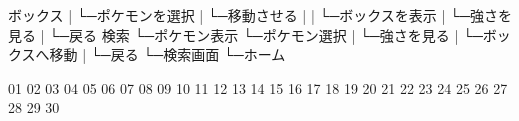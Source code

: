 ボックス
|   └─ポケモンを選択
|       └─移動させる
|       |    └─ボックスを表示
|       └─強さを見る
|       └─戻る
検索
└─ポケモン表示
    └─ポケモン選択
    |   └─強さを見る
    |   └─ボックスへ移動
    |   └─戻る
    └─検索画面
    └─ホーム

01  02  03  04  05  06
07  08  09  10  11  12
13  14  15  16  17  18
19  20  21  22  23  24
25  26  27  28  29  30